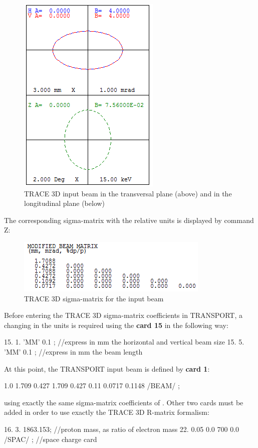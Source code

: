 \begin{figure}[htbp]
 \centering
     \includegraphics[width=0.5\textwidth-0.6cm, keepaspectratio=true]{figures/Benchmarks/Input_Trace.png}
    \caption{TRACE 3D input beam in the transversal plane (above) and in the longitudinal plane (below)}
    \label{fig:Input_TRACE}
\end{figure}
The corresponding sigma-matrix with the relative units is displayed by command Z:
\begin{figure}[htbp]
 \centering
     \includegraphics[width=0.5\textwidth-0.6cm, keepaspectratio=true]{figures/Benchmarks/TRACE_z_input.png}
    \caption{TRACE 3D sigma-matrix for the input beam}
    \label{fig:TRACE_z_Input}
\end{figure}
Before entering the TRACE 3D sigma-matrix coefficients in TRANSPORT, a changing in the units is required using the \textbf{card 15} in the following way:
\begin{example}
15. 1. 'MM' 0.1 ; //express in mm the horizontal and vertical beam size
15. 5. 'MM' 0.1 ; //express in mm the beam length
\end{example}

At this point, the TRANSPORT input beam is defined by \textbf{card 1}:
\begin{example}
1.0 1.709 0.427 1.709 0.427 0.11 0.0717 0.1148 /BEAM/ ;
\end{example}

using exactly the same sigma-matrix coefficients of . Other two cards must be added in order to use exactly the TRACE 3D R-matrix formalism:
\begin{example}
16. 3. 1863.153; //proton mass, as ratio of electron mass
22. 0.05 0.0 700 0.0 /SPAC/ ; //space charge card
\end{example}
